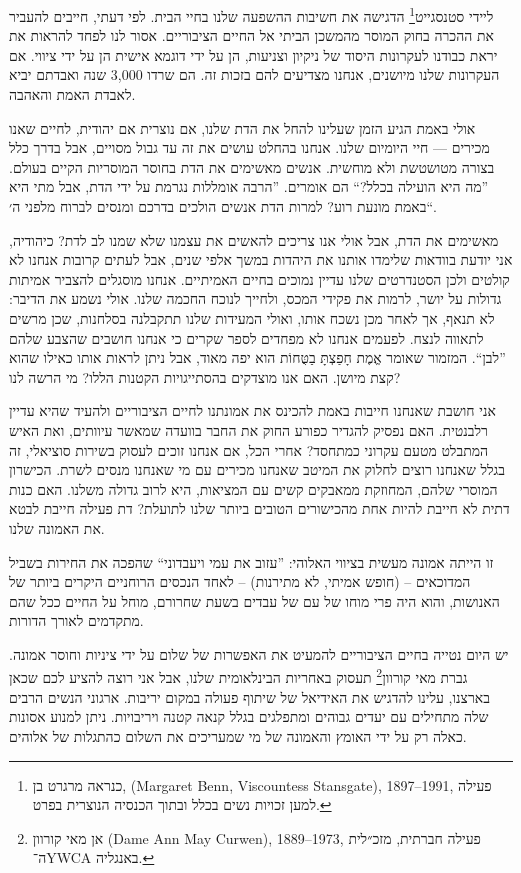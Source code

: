 \documentclass[12pt, extrafontsizes, twopage, a5paper]{memoir}
\begin{document}
ליידי סטנסגייט\footnote{כנראה מרגרט בן, (\textenglish{Margaret Benn, Viscountess Stansgate}), 1897--1991, פעילה למען זכויות נשים בכלל ובתוך הכנסיה הנוצרית בפרט.} הדגישה את חשיבות ההשפעה שלנו בחיי הבית. לפי דעתי, חייבים להעביר את ההכרה בחוק המוסר מהמשכן הביתי אל החיים הציבוריים. אסור לנו לפחד להראות את יראת כבודנו לעקרונות היסוד של ניקיון וצניעות, הן על ידי דוגמא אישית הן על ידי ציווי. אם העקרונות שלנו מיושנים, אנחנו מצדיעים להם בזכות זה. הם שרדו 3,000 שנה ואבדתם יביא לאבדת האמת והאהבה.

אולי באמת הגיע הזמן שעלינו להחל את הדת שלנו, אם נוצרית אם יהודית, לחיים שאנו מכירים --- חיי היומיום שלנו. אנחנו בהחלט עושים את זה עד גבול מסויים, אבל בדרך כלל בצורה מטושטשת ולא מוחשית. אנשים מאשימים את הדת בחוסר המוסריות הקיים בעולם. ”מה היא הועילה בכלל?“ הם אומרים. ”הרבה אומללות נגרמת על ידי הדת, אבל מתי היא באמת מונעת רוע? למרות הדת אנשים הולכים בדרכם ומנסים לברוח מלפני ה׳“.

מאשימים את הדת, אבל אולי אנו צריכים להאשים את עצמנו שלא שמנו לב לדת? כיהודיה, אני יודעת בוודאות שלימדו אותנו את היהדות במשך אלפי שנים, אבל לעתים קרובות אנחנו לא קולטים ולכן הסטנדרטים שלנו עדיין נמוכים בחיים האמיתיים. אנחנו מוסגלים להצביר אמיתות גדולות על יושר, לרמות את פקידי המכס, ולחייך לנוכח החכמה שלנו. אולי נשמע את הדיבר: לא תנאף, אך לאחר מכן נשכח אותו, ואולי המעידות שלנו תתקבלנה בסלחנות, שכן מרשים לתאווה לנצח. לפעמים אנחנו לא מפחדים לספר שקרים כי אנחנו חושבים שהצבע שלהם ”לבן“. המזמור שאומר אֱמֶת חָפַצְתָּ בַטֻּחוֹת הוא יפה מאוד, אבל ניתן לראות אותו כאילו שהוא קצת מיושן. האם אנו מוצדקים בהסתייגויות הקטנות הללו? מי הרשה לנו?

אני חושבת שאנחנו חייבות באמת להכינס את אמונתנו לחיים הציבוריים ולהעיד שהיא עדיין רלבנטית. האם נפסיק להגדיר כפורע החוק את החבר בוועדה שמאשר עיוותים, ואת האיש המתבלט מטעם עקרוני כמתחסד? אחרי הכל, אם אנחנו זוכים לעסוק בשירות סוציאלי, זה בגלל שאנחנו רוצים לחלוק את המיטב שאנחנו מכירים עם מי שאנחנו מנסים לשרת. הכישרון המוסרי שלהם, המחוזקת ממאבקים קשים עם המציאות, היא לרוב גדולה משלנו. האם כנות דתית לא חייבת להיות אחת מהכישורים הטובים ביותר שלנו לתועלת? דת פעילה חייבת לבטא את האמונה שלנו.

זו הייתה אמונה מעשית בציווי האלוהי: ”עזוב את עמי ויעבדוני“ שהפכה את החירות בשביל המדוכאים -- (חופש אמיתי, לא מתירנות) -- לאחד הנכסים הרוחניים היקרים ביותר של האנושות, והוא היה פרי מוחו של עם של עבדים בשעת שחרורם, מוחל על החיים ככל שהם מתקדמים לאורך הדורות.

יש היום נטייה בחיים הציבוריים להמעיט את האפשרות של שלום על ידי ציניות וחוסר אמונה. גברת מאי קורוון\footnote{אן מאי קורוון (\textenglish{Dame Ann May Curwen}), 1889--1973, פעילה חברתית, מזכ״לית ה־\textenglish{YWCA} באנגליה.} תעסוק באחריות הבינלאומית שלנו, אבל אני רוצה להציע לכם שכאן בארצנו, עלינו להדגיש את האידיאל של שיתוף פעולה במקום יריבות. ארגוני הנשים הרבים שלה מתחילים עם יעדים גבוהים ומתפלגים בגלל קנאה קטנה ויריבויות. ניתן למנוע אסונות כאלה רק על ידי האומץ והאמונה של מי שמעריכים את השלום כהתגלות של אלוהים.
\end{document}
